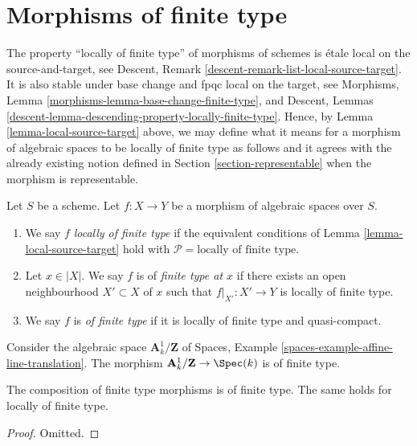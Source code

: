 \section{Morphisms of finite type}
\label{section-finite-type}

\noindent
The property ``locally of finite type'' of morphisms of schemes
is \'etale local on the source-and-target, see
Descent, Remark \ref{descent-remark-list-local-source-target}.
It is also stable under base change and fpqc local on the target, see
Morphisms, Lemma \ref{morphisms-lemma-base-change-finite-type}, and
Descent, Lemmas \ref{descent-lemma-descending-property-locally-finite-type}.
Hence, by
Lemma \ref{lemma-local-source-target}
above, we may define what it means for a morphism of algebraic spaces
to be locally of finite type as
follows and it agrees with the already existing notion defined in
Section \ref{section-representable}
when the morphism is representable.

\begin{definition}
\label{definition-locally-finite-type}
Let $S$ be a scheme.
Let $f : X \to Y$ be a morphism of algebraic spaces over $S$.
\begin{enumerate}
\item We say $f$
{\it locally of finite type} if the equivalent conditions of
Lemma \ref{lemma-local-source-target}
hold with
$\mathcal{P} = \text{locally of finite type}$.
\item Let $x \in |X|$. We say $f$ is of {\it finite type at $x$}
if there exists an open neighbourhood $X' \subset X$ of $x$ such
that $f|_{X'} : X' \to Y$ is locally of finite type.
\item We say $f$ is
{\it of finite type} if it is locally of finite type and quasi-compact.
\end{enumerate}
\end{definition}

\noindent
Consider the algebraic space $\mathbf{A}^1_k/\mathbf{Z}$ of
Spaces, Example \ref{spaces-example-affine-line-translation}.
The morphism $\mathbf{A}^1_k/\mathbf{Z} \to \Spec(k)$
is of finite type.

\begin{lemma}
\label{lemma-composition-finite-type}
The composition of finite type morphisms is of finite type.
The same holds for locally of finite type.
\end{lemma}

\begin{proof}
Omitted.
\end{proof}

